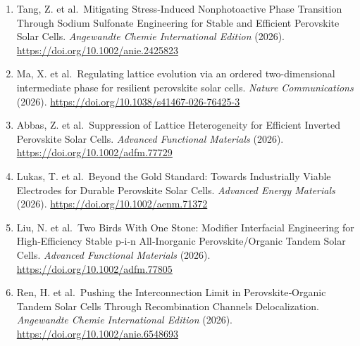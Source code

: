 \documentclass[
  11pt,
]{article}
\begin{document}
\begin{enumerate}
  (2026). \url{https://doi.org/10.1002/adma.74438}
\item
  Tang, Z. et al.~Mitigating Stress‐Induced Nonphotoactive Phase
  Transition Through Sodium Sulfonate Engineering for Stable and
  Efficient Perovskite Solar Cells. \emph{Angewandte Chemie
  International Edition} (2026).
  \url{https://doi.org/10.1002/anie.2425823}
\item
  Ma, X. et al.~Regulating lattice evolution via an ordered
  two-dimensional intermediate phase for resilient perovskite solar
  cells. \emph{Nature Communications} (2026).
  \url{https://doi.org/10.1038/s41467-026-76425-3}
\item
  Abbas, Z. et al.~Suppression of Lattice Heterogeneity for Efficient
  Inverted Perovskite Solar Cells. \emph{Advanced Functional Materials}
  (2026). \url{https://doi.org/10.1002/adfm.77729}
\item
  Lukas, T. et al.~Beyond the Gold Standard: Towards Industrially Viable
  Electrodes for Durable Perovskite Solar Cells. \emph{Advanced Energy
  Materials} (2026). \url{https://doi.org/10.1002/aenm.71372}
\item
  Liu, N. et al.~Two Birds With One Stone: Modifier Interfacial
  Engineering for High‐Efficiency Stable p‐i‐n All‐Inorganic
  Perovskite/Organic Tandem Solar Cells. \emph{Advanced Functional
  Materials} (2026). \url{https://doi.org/10.1002/adfm.77805}
\item
  Ren, H. et al.~Pushing the Interconnection Limit in Perovskite‐Organic
  Tandem Solar Cells Through Recombination Channels Delocalization.
  \emph{Angewandte Chemie International Edition} (2026).
  \url{https://doi.org/10.1002/anie.6548693}
\end{enumerate}
\end{document}
